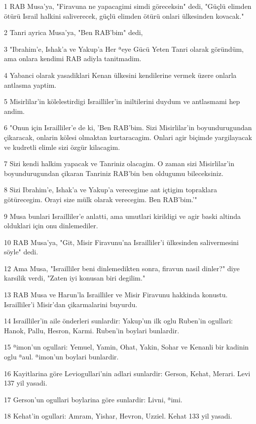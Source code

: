 \par 1 RAB Musa'ya, "Firavuna ne yapacagimi simdi göreceksin" dedi, "Güçlü elimden ötürü Israil halkini saliverecek, güçlü elimden ötürü onlari ülkesinden kovacak."
\par 2 Tanri ayrica Musa'ya, "Ben RAB'bim" dedi,
\par 3 "Ibrahim'e, Ishak'a ve Yakup'a Her ªeye Gücü Yeten Tanri olarak göründüm, ama onlara kendimi RAB adiyla tanitmadim.
\par 4 Yabanci olarak yasadiklari Kenan ülkesini kendilerine vermek üzere onlarla antlasma yaptim.
\par 5 Misirlilar'in kölelestirdigi Israilliler'in iniltilerini duydum ve antlasmami hep andim.
\par 6 "Onun için Israilliler'e de ki, 'Ben RAB'bim. Sizi Misirlilar'in boyundurugundan çikaracak, onlarin kölesi olmaktan kurtaracagim. Onlari agir biçimde yargilayacak ve kudretli elimle sizi özgür kilacagim.
\par 7 Sizi kendi halkim yapacak ve Tanriniz olacagim. O zaman sizi Misirlilar'in boyundurugundan çikaran Tanriniz RAB'bin ben oldugumu bileceksiniz.
\par 8 Sizi Ibrahim'e, Ishak'a ve Yakup'a verecegime ant içtigim topraklara götürecegim. Orayi size mülk olarak verecegim. Ben RAB'bim.'"
\par 9 Musa bunlari Israilliler'e anlatti, ama umutlari kirildigi ve agir baski altinda olduklari için onu dinlemediler.
\par 10 RAB Musa'ya, "Git, Misir Firavunu'na Israilliler'i ülkesinden salivermesini söyle" dedi.
\par 12 Ama Musa, "Israilliler beni dinlemedikten sonra, firavun nasil dinler?" diye karsilik verdi, "Zaten iyi konusan biri degilim."
\par 13 RAB Musa ve Harun'la Israilliler ve Misir Firavunu hakkinda konustu. Israilliler'i Misir'dan çikarmalarini buyurdu.
\par 14 Israilliler'in aile önderleri sunlardir: Yakup'un ilk oglu Ruben'in ogullari: Hanok, Pallu, Hesron, Karmi. Ruben'in boylari bunlardir.
\par 15 ªimon'un ogullari: Yemuel, Yamin, Ohat, Yakin, Sohar ve Kenanli bir kadinin oglu ªaul. ªimon'un boylari bunlardir.
\par 16 Kayitlarina göre Leviogullari'nin adlari sunlardir: Gerson, Kehat, Merari. Levi 137 yil yasadi.
\par 17 Gerson'un ogullari boylarina göre sunlardir: Livni, ªimi.
\par 18 Kehat'in ogullari: Amram, Yishar, Hevron, Uzziel. Kehat 133 yil yasadi.

